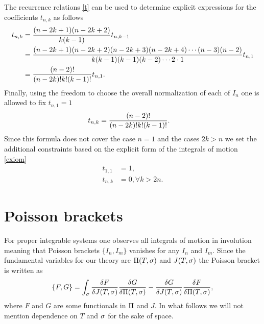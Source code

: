\documentclass[12pt]{article}%
\numberwithin{equation}{section}
\begin{document}
The recurrence relations \eqref{t} can be used to determine explicit expressions for the coefficients $t_{n,k}$ as follows
\begin{equation}
\begin{aligned}
t_{n,k}&=\fr{(n-2k+1)(n-2k+2)}{k(k-1)}t_{n,k-1}\\
&=\fr{(n-2k+1)(n-2k+2)(n-2k+3)(n-2k+4)\cdots (n-3)(n-2)}{k(k-1)(k-1)(k-2)\cdots 2\cdot1}t_{n,1}\\
&=\fr{(n-2)!}{(n-2k)!k!(k-1)!}t_{n,1}.
\end{aligned}
\end{equation}
Finally, using the freedom to choose the overall normalization of each of $I_{n}$ one is allowed to fix $t_{n,1}=1$ 
\begin{equation}
\begin{aligned}
t_{n,k}&=\fr{(n-2)!}{(n-2k)!k!(k-1)!}.
\end{aligned}
\end{equation}
Since this formula does not cover the case $n=1$ and the cases $2k > n$ we set the additional constraints based on the explicit form of the integrals of motion \eqref{exiom}
\begin{equation}
\begin{aligned}
t_{1,1}&=1,\\
t_{n,k}&=0, \forall k>2n.
\end{aligned}
\end{equation}


\section{Poisson brackets}

For proper integrable systems one observes all integrals of motion in involution meaning that Poisson brackets $\{I_n,I_m\}$ vanishes for any $I_n$ and $I_m$. Since the fundamental variables for our theory are $\P(T,\s)$ and $J(T,\s)$ the Poisson bracket is written as
\begin{equation}
\{F,G\}=\int_\s \fr{\d F}{\d J(T,\s)}\fr{\d G}{\d \P(T,\s)}-\fr{\d G}{\d J(T,\s)}\fr{\d F}{\d \P(T,\s)},
\end{equation}
where $F$ and $G$ are some functionals in $\P$ and $J$. In what follows we will not mention dependence on $T$ and $\s$ for the sake of space.
\end{document}
